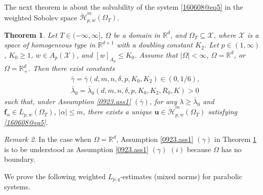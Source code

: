 \documentclass[reqno]{amsart}
\numberwithin{equation}{section}
\theoremstyle{plain}
\newtheorem{theorem}{Theorem}[section]
\theoremstyle{definition}
\theoremstyle{remark}
\newtheorem{remark}[theorem]{Remark}
\begin{document}
The next theorem is about the solvability of the system \eqref{160608@eq5} in the weighted Sobolev space $\mathring{\mathcal{H}}^m_{p,w}( \Omega_T)$.

\begin{theorem}		\label{160621@thm1}
Let $T\in (-\infty,\infty]$, $\Omega$  be a domain in ${\mathbb{R}}^d$, and $\Omega_T\subseteq {\mathcal{X}}$, where ${\mathcal{X}}$ is  a space of homogeneous type in ${\mathbb{R}}^{d+1}$ with a doubling constant $K_2$.
Let $p\in (1,\infty)$, $K_0\ge 1$, $w\in A_p({\mathcal{X}})$, and $[w]_{A_p}\le K_0$.
Assume that $|\Omega|<\infty$, $\Omega={\mathbb{R}}^d$, or $\Omega={\mathbb{R}}^d_+$.
Then there exist constants 
\begin{align*}
&\bar\gamma=\bar\gamma(d,m,n,\delta,p,K_0,K_2)\in (0,1/6),\\
&\bar\lambda_0=\bar\lambda_0(d,m,n,\delta,p, K_0, K_2, R_0,K)>0
\end{align*}
such that, under Assumption \ref{0923.ass1} $(\bar\gamma)$, for any $\lambda\ge \bar\lambda_0$ and ${\boldsymbol{f}}_\alpha\in L_{p,w}(\Omega_T)$, $|\alpha|\le m$, there exists a unique  ${\boldsymbol{u}}\in \mathring{\mathcal{H}}_{p,w}^m(\Omega_T)$ satisfying \eqref{160608@eq5}.
\end{theorem}

\begin{remark}
In the case when $\Omega={\mathbb{R}}^d$,  
Assumption \ref{0923.ass1} $(\gamma)$ in Theorem \ref{160621@thm1} is to be understood as Assumption \ref{0923.ass1} $(\gamma)$ $(i)$ because $\Omega$ has no boundary.
\end{remark}

We prove the following weighted $L_{p,q}$-estimates (mixed norms) for parabolic systems.
\end{document}
